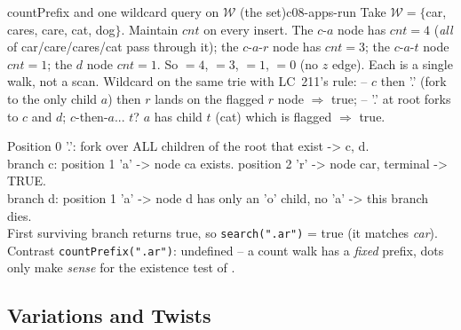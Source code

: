 \begin{example}{countPrefix and one wildcard query on $\mathcal{W}$ (the  set)}{c08-apps-run}
Take $\mathcal{W}=\{$car, cares, care, cat, dog$\}$. Maintain $\mathit{cnt}$ on every insert. The
$c$-$a$ node has $\mathit{cnt}=4$ (\emph{all} of car/care/cares/cat pass through it); the $c$-$a$-$r$
node has $\mathit{cnt}=3$; the $c$-$a$-$t$ node $\mathit{cnt}=1$; the $d$ node $\mathit{cnt}=1$. So
$=4$, $=3$, $=1$,
$=0$ (no $z$ edge). Each is a single walk, not a scan. Wildcard on the same
trie with LC~211's rule:  -- $c$ then '.' (fork to the only child $a$) then $r$
lands on the flagged $r$ node $\Rightarrow$ true;  -- '.' at root forks to $c$ and
$d$; $c$-then-$a$... $t$? $a$ has child $t$ (cat) which is flagged $\Rightarrow$ true.
\end{example}
\begin{tracebox}
Position 0 '.': fork over ALL children of the root that exist -> c, d.\\
  branch c: position 1 'a' -> node ca exists. position 2 'r' -> node car, terminal -> TRUE.\\
  branch d: position 1 'a' -> node d has only an 'o' child, no 'a' -> this branch dies.\\
First surviving branch returns true, so \texttt{search(".ar")} = true (it matches \emph{car}).\\
Contrast \texttt{countPrefix(".ar")}: undefined -- a count walk has a \emph{fixed} prefix, dots only make
\emph{sense} for the existence test of .
\end{tracebox}

\subsection{Variations and Twists}

